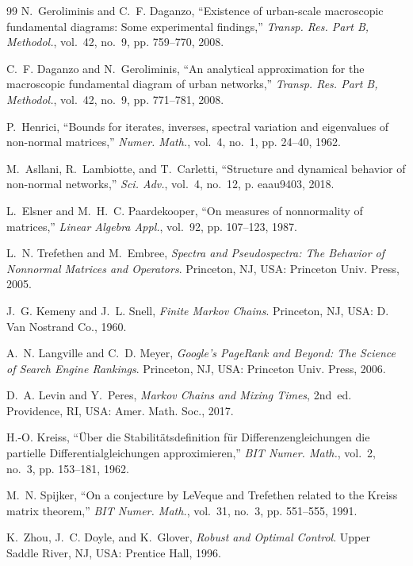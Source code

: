 \documentclass[journal]{IEEEtran}
\begin{document}
\begin{thebibliography}{99}
N.~Geroliminis and C.~F. Daganzo, ``Existence of urban-scale macroscopic fundamental diagrams: Some experimental findings,'' \emph{Transp. Res. Part B, Methodol.}, vol.~42, no.~9, pp. 759--770, 2008.

C.~F. Daganzo and N.~Geroliminis, ``An analytical approximation for the macroscopic fundamental diagram of urban networks,'' \emph{Transp. Res. Part B, Methodol.}, vol.~42, no.~9, pp. 771--781, 2008.

P.~Henrici, ``Bounds for iterates, inverses, spectral variation and eigenvalues of non-normal matrices,'' \emph{Numer. Math.}, vol.~4, no.~1, pp. 24--40, 1962.

M.~Asllani, R.~Lambiotte, and T.~Carletti, ``Structure and dynamical behavior of non-normal networks,'' \emph{Sci. Adv.}, vol.~4, no.~12, p. eaau9403, 2018.

L.~Elsner and M.~H.~C. Paardekooper, ``On measures of nonnormality of matrices,'' \emph{Linear Algebra Appl.}, vol.~92, pp. 107--123, 1987.

L.~N. Trefethen and M.~Embree, \emph{Spectra and Pseudospectra: The Behavior of Nonnormal Matrices and Operators}. Princeton, NJ, USA: Princeton Univ. Press, 2005.

J.~G. Kemeny and J.~L. Snell, \emph{Finite Markov Chains}. Princeton, NJ, USA: D. Van Nostrand Co., 1960.

A.~N. Langville and C.~D. Meyer, \emph{Google's PageRank and Beyond: The Science of Search Engine Rankings}. Princeton, NJ, USA: Princeton Univ. Press, 2006.

D.~A. Levin and Y.~Peres, \emph{Markov Chains and Mixing Times}, 2nd~ed. Providence, RI, USA: Amer. Math. Soc., 2017.

H.-O. Kreiss, ``\"Uber die Stabilit\"atsdefinition f\"ur Differenzengleichungen die partielle Differentialgleichungen approximieren,'' \emph{BIT Numer. Math.}, vol.~2, no.~3, pp. 153--181, 1962.

M.~N. Spijker, ``On a conjecture by {LeVeque} and {Trefethen} related to the {Kreiss} matrix theorem,'' \emph{BIT Numer. Math.}, vol.~31, no.~3, pp. 551--555, 1991.

K.~Zhou, J.~C. Doyle, and K.~Glover, \emph{Robust and Optimal Control}. Upper Saddle River, NJ, USA: Prentice Hall, 1996.


\end{thebibliography}
\end{document}
